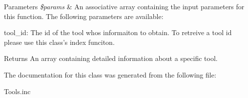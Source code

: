 \begin{DoxyParams}{Parameters}
{\em \$params} & An associative array containing the input parameters for this function. The following parameters are available\-:\\
\hline
\end{DoxyParams}

\begin{DoxyItemize}
\item tool\-\_\-id\-: The id of the tool whos informaiton to obtain. To retreive a tool id please use this class's index funciton.
\end{DoxyItemize}

\begin{DoxyReturn}{Returns}
An array containing detailed information about a specific tool. 
\end{DoxyReturn}


The documentation for this class was generated from the following file\-:\begin{DoxyCompactItemize}
\item 
Tools.\-inc\end{DoxyCompactItemize}
